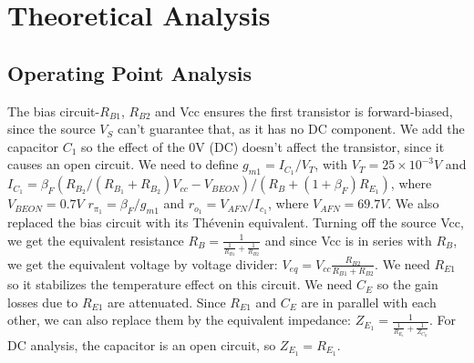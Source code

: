 \section{Theoretical Analysis}
\label{sec:octave}

\subsection{Operating Point Analysis}
The bias circuit-$R_{B1}$, $R_{B2}$ and Vcc ensures the first transistor is forward-biased, since the source $V_S$ can't guarantee that, as it has no DC component. We add the capacitor $C_1$ so the effect of the 0V (DC) doesn't affect the transistor, since it causes an open circuit.
We need to define $g_{m1}=I_{C_1}/V_T$, with $V_T=25 \times 10^{-3} V$ and $I_{C_1}=\beta_F (R_{B_2}/(R_{B_1}+R_{B_2})V_{cc} -V_{BEON})/(R_B+(1+\beta_F)R_{E_1})$, where $V_{BEON}=0.7 V$ $r_{\pi_1}=\beta_F/g_{m1}$ and $r_{o_1}=V_{AFN}/I_{c_1}$, where $V_{AFN}=69.7 V$.
We also replaced the bias circuit with its Thévenin equivalent. Turning off the source Vcc, we get the equivalent resistance $R_B= \frac{1}{\frac{1}{R_{B1}}+\frac{1}{R_{B2}}}$ and since Vcc is in series with $R_B$, we get the equivalent voltage by voltage divider: $V_{eq}=V_{cc}\frac{R_{B2}}{R_{B1}+R_{B2}}$.
We need $R_{E1}$ so it stabilizes the temperature effect on this circuit. We need $C_E$ so the gain losses due to $R_{E1}$ are attenuated.
Since $R_{E1}$ and $C_E$ are in parallel with each other, we can also replace them by the equivalent impedance: $Z_{E_1}=\frac{1}{\frac{1}{R_{E_1}}+\frac{1}{Z_{C_E}}}$. For DC analysis, the capacitor is an open circuit, so $Z_{E_1}=R_{E_1}$.


